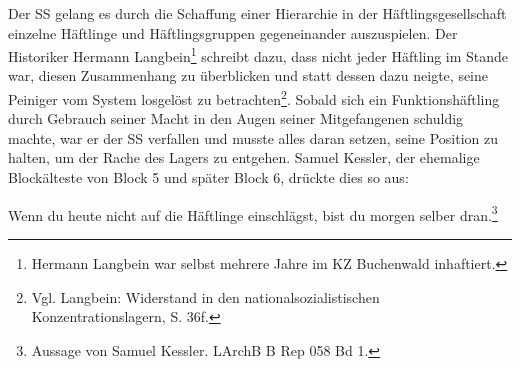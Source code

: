 Der SS gelang es durch die Schaffung einer Hierarchie in der Häftlingsgesellschaft einzelne Häftlinge und Häftlingsgruppen gegeneinander auszuspielen.
Der Historiker Hermann Langbein\footnote{Hermann Langbein war selbst mehrere Jahre im KZ Buchenwald inhaftiert.} schreibt dazu, dass nicht jeder Häftling im Stande war, diesen Zusammenhang zu überblicken und statt dessen dazu neigte, seine Peiniger vom System losgelöst zu betrachten\footnote{Vgl. Langbein: Widerstand in den nationalsozialistischen Konzentrationslagern, S. 36f.}. Sobald sich ein Funktionshäftling durch Gebrauch seiner Macht in den Augen seiner Mitgefangenen schuldig machte, war er der SS verfallen und musste alles daran setzen, seine Position zu halten, um der Rache des Lagers zu entgehen.
Samuel Kessler, der ehemalige Blockälteste von Block 5 und später Block 6, drückte dies so aus:
\begin{leftbar}
Wenn du heute nicht auf die Häftlinge einschlägst, bist du morgen selber dran.\footnote{Aussage von Samuel Kessler. LArchB B Rep 058 Bd 1.}
\end{leftbar}

